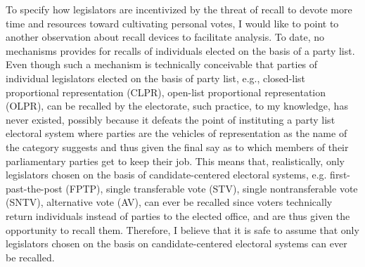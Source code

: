 \documentclass[hyphens, crop=false]{standalone}
\begin{document}
		
		To specify how legislators are incentivized by the threat of recall to devote more time and resources toward cultivating personal votes,
		I would like to point to another observation about recall devices to facilitate analysis.
		To date,
		no mechanisms provides for recalls of individuals elected on the basis of a party list.
		Even though such a mechanism is technically conceivable that parties of individual legislators elected on the basis of party list,
		e.g.,
		closed-list proportional representation (CLPR),
		open-list proportional representation (OLPR),
		can be recalled by the electorate,
		such practice,
		to my knowledge,
		has never existed,
		possibly because it defeats the point of instituting a party list electoral system where
		parties are the vehicles of representation as the name of the category suggests and thus
		given the final say as to which members of their parliamentary parties get to keep their job.
		This means that,
		realistically,
		only legislators chosen on the basis of candidate-centered electoral systems,
		e.g.
		first-past-the-post (FPTP),
		single transferable vote (STV),
		single nontransferable vote (SNTV),
		alternative vote (AV),
		can ever be recalled since voters technically return individuals instead of parties to the elected office,
		and are thus given the opportunity to recall them.
		Therefore,
		I believe that it is safe to assume that only legislators chosen on the basis on candidate-centered electoral systems can ever be recalled.
		
\end{document}
